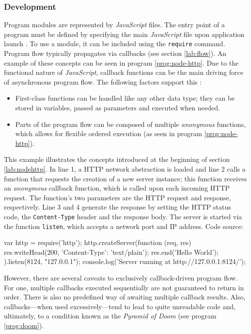\subsubsection*{Development}
\label{lab:nodehttp}
Program modules are represented by \textit{JavaScript} files. The entry point of a program must be defined by specifying the main \textit{JavaScript} file upon application launch \cite[p. 16]{Hughes-Croucher2012}. To use a module, it can be included using the \texttt{require} command. Program flow typically propagates via callbacks (see section \ref{lab:flow}). An example of these concepts can be seen in program \ref{prog:node-http}. Due to the functional nature of \textit{JavaScript}, callback functions can be the main driving force of asynchronous program flow. The following factors support this \cite{node-loop}:
\begin{itemize}
  \item First-class functions can be handled like any other data type; they can be stored in variables, passed as parameters and executed when needed.
  \item Parts of the program flow can be composed of multiple \textit{anonymous} functions, which allows for flexible ordered execution (as seen in program \ref{prog:node-http}).
\end{itemize}
\begin{program}
  \caption{This example illustrates the concepts introduced at the beginning of section \ref{lab:nodehttp}. In line 1, a HTTP network abstraction is loaded and line 2 calls a function that requests the creation of a new server instance; this function receives an \textit{anonymous} callback function, which is called upon each incoming HTTP request. The function's two parameters are the HTTP request and response, respectively. Line 3 and 4 generate the response by setting the HTTP status code, the \texttt{Content-Type} header and the response body. The server is started via the function \texttt{listen}, which accepts a network port and IP address. Code source: \cite[p. 9]{Hughes-Croucher2012}}
  \label{prog:node-http}
  \begin{JavaCode}
var http = require('http');
http.createServer(function (req, res) {
    res.writeHead(200, {'Content-Type': 'text/plain'}); 
    res.end('Hello World\n');
}).listen(8124, "127.0.0.1");
console.log('Server running at http://127.0.0.1:8124/');
  \end{JavaCode}
\end{program}
However, there are several caveats to exclusively callback-driven program flow. For one, multiple callbacks executed sequentially are not guaranteed to return in order. There is also no predefined way of awaiting multiple callback results. Also, callbacks---when used excessively---tend to lead to quite unreadable code and, ultimately, to a condition known as the \textit{Pyramid of Doom} (see program \ref{prog:doom}).
